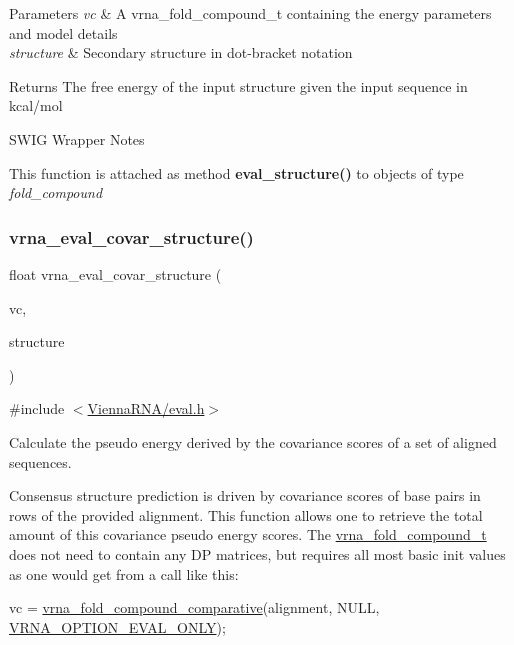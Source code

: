 \begin{DoxyParams}{Parameters}
{\em vc} & A vrna\+\_\+fold\+\_\+compound\+\_\+t containing the energy parameters and model details \\
\hline
{\em structure} & Secondary structure in dot-\/bracket notation \\
\hline
\end{DoxyParams}
\begin{DoxyReturn}{Returns}
The free energy of the input structure given the input sequence in kcal/mol
\end{DoxyReturn}
\begin{DoxyRefDesc}{S\+W\+I\+G Wrapper Notes}
\item[\hyperlink{wrappers__wrappers000025}{S\+W\+I\+G Wrapper Notes}]This function is attached as method {\bfseries eval\+\_\+structure()} to objects of type {\itshape fold\+\_\+compound} \end{DoxyRefDesc}
\mbox{\label{group__eval_ga6cea75c0eb9857fb59172be54cab09e0}} 
\subsubsection{\texorpdfstring{vrna\+\_\+eval\+\_\+covar\+\_\+structure()}{vrna\_eval\_covar\_structure()}}
{\footnotesize\ttfamily float vrna\+\_\+eval\+\_\+covar\+\_\+structure (\begin{DoxyParamCaption}\item[{\hyperlink{group__fold__compound_ga1b0cef17fd40466cef5968eaeeff6166}{vrna\+\_\+fold\+\_\+compound\+\_\+t} $\ast$}]{vc,  }\item[{const char $\ast$}]{structure }\end{DoxyParamCaption})}



{\ttfamily \#include $<$\hyperlink{eval_8h}{Vienna\+R\+N\+A/eval.\+h}$>$}



Calculate the pseudo energy derived by the covariance scores of a set of aligned sequences. 

Consensus structure prediction is driven by covariance scores of base pairs in rows of the provided alignment. This function allows one to retrieve the total amount of this covariance pseudo energy scores. The \hyperlink{group__fold__compound_ga1b0cef17fd40466cef5968eaeeff6166}{vrna\+\_\+fold\+\_\+compound\+\_\+t} does not need to contain any DP matrices, but requires all most basic init values as one would get from a call like this\+: 
\begin{DoxyCode}
vc = \hyperlink{group__fold__compound_gad6bacc816af274922b13d947f708aa0c}{vrna\_fold\_compound\_comparative}(alignment, NULL, 
      \hyperlink{group__fold__compound_ga61469c423131552c8483229f8b6c7e0e}{VRNA\_OPTION\_EVAL\_ONLY});
\end{DoxyCode}


